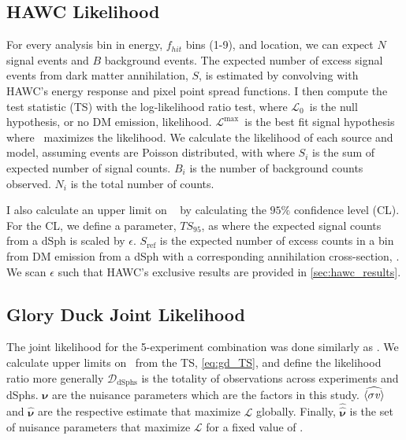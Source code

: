 \subsection{HAWC Likelihood}\label{sec:gd_hawc_llh}

For every analysis bin in energy, $f_{hit}$ bins (1-9), and location, we can expect $N$ signal events and $B$ background events.
The expected number of excess signal events from dark matter annihilation, $S$, is estimated by convolving  with HAWC's energy response and pixel point spread functions.
I then compute the test statistic (TS) with the log-likelihood ratio test,
\gdTS
where $\mathcal{L}_0$~is the null hypothesis, or no DM emission, likelihood.
$\mathcal{L}^\mathrm{max}$~is the best fit signal hypothesis where \sv~maximizes the likelihood.
We calculate the likelihood of each source and model, assuming events are Poisson distributed, with
\hwcpsLLH
where $S_i$ is the sum of expected number of signal counts.
$B_i$ is the number of background counts observed.
$N_i$ is the total number of counts.

I also calculate an upper limit on \sv~ by calculating the $95\%$ confidence level (CL).
For the CL, we define a parameter, $TS_{95}$, as
\gdHAWCCL
where the expected signal counts from a dSph is scaled by $\epsilon$.
$S_\mathrm{ref}$ is the expected number of excess counts in a bin from DM emission from a dSph with a corresponding annihilation cross-section, \sv.
We scan $\epsilon$ such that
\CLbyTS
HAWC's exclusive results are provided in \cref{sec:hawc_results}.

\subsection{Glory Duck Joint Likelihood}\label{sec:gd_joint_llh}

The joint likelihood for the 5-experiment combination was done similarly as .
We calculate upper limits on \sv~from the TS, \cref{eq:gd_TS}, and define the likelihood ratio more generally
\gdLHratio
$\bm{\mathcal{D}_{\mathrm{dSphs}}}$ is the totality of observations across experiments and dSphs.
$\bm{\nu}$ are the nuisance parameters which are the \J factors in this study.
$\widehat{\langle \sigma \mathit{v} \rangle}$ and $\hat{\bm{\nu}}$ are the respective estimate that maximize $\mathcal{L}$ globally.
Finally, $\hat{\hat{\bm{\nu}}}$ is the set of nuisance parameters that maximize $\mathcal{L}$ for a fixed value of \sv.

